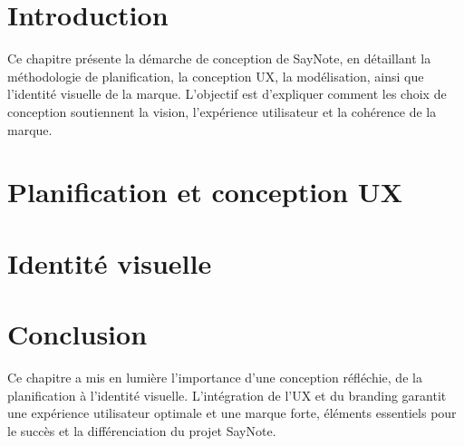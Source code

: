 
\section*{Introduction}
Ce chapitre présente la démarche de conception de SayNote, en détaillant la méthodologie de planification, la conception UX, la modélisation, ainsi que l'identité visuelle de la marque. L'objectif est d'expliquer comment les choix de conception soutiennent la vision, l'expérience utilisateur et la cohérence de la marque.

\section{Planification et conception UX}


\section{Identité visuelle}


\section*{Conclusion}
Ce chapitre a mis en lumière l'importance d'une conception réfléchie, de la planification à l'identité visuelle. L'intégration de l'UX et du branding garantit une expérience utilisateur optimale et une marque forte, éléments essentiels pour le succès et la différenciation du projet SayNote.
